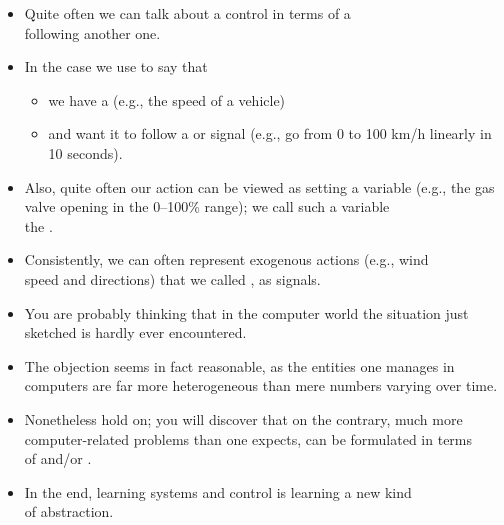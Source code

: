 \begin{frame}
\framesubtitleTC{}
\myPause
 \begin{itemize}[<+-| alert@+>]
 \item Quite often we can talk about a control  in terms of a \\
       following another one.
 \item In the case we use to say that
       \begin{itemize}[<+-| alert@+>]
       \item we have a  (e.g., the speed of a vehicle)
       \item and want it to follow a  or  signal (e.g., go from 0 to 100 km/h
             linearly in 10 seconds).
       \end{itemize}
 \item Also, quite often our action can be viewed as setting a variable (e.g., the gas\\
       valve opening in the 0--100\% range); we call such a variable\\
       the .
 \item Consistently, we can often represent exogenous actions (e.g., wind\\
       speed and directions) that we called , as signals.
 \end{itemize}
\end{frame}

\begin{frame}
\framesubtitleTC{}
\myPause
 \begin{itemize}[<+-| alert@+>]
 \item You are probably thinking that in the computer world the situation just sketched is hardly ever encountered.
 \item The objection seems in fact reasonable, as the entities one manages in computers are far more
       heterogeneous than mere numbers varying over time.
 \item \vfill Nonetheless hold on; you will discover that on the contrary, much more computer-related problems
       than one expects, can be formulated in terms\\ of  and/or .
 \item In the end, learning systems and control is learning a new kind\\
       of abstraction.
 \end{itemize}
\end{frame}


